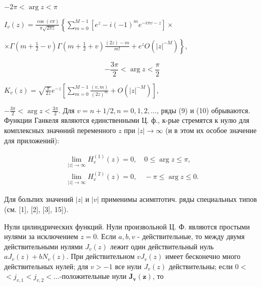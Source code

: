 \documentclass[10pt]{article}
\begin{document}
$-2 \pi<\arg z<\pi$



$I_{v}(z)=\frac{\cos (v \pi)}{\pi \sqrt{2 \pi z}}\left\{\sum_{m=0}^{M-1}\left[e^{z}-i(-1)^{m} e^{-i \pi v-z}\right] \times\right.$



$\left.\times \Gamma\left(m+\frac{1}{2}-v\right) \Gamma\left(m+\frac{1}{2}+v\right) \frac{(2 z)-m}{m !}+e^{z} O\left(|z|^{-M}\right)\right\}$,



\[

-\frac{3 \pi}{2}<\arg z<\frac{\pi}{2}

\]



$K_{v}(z)=\sqrt{\frac{\pi}{2 z}} e^{-z}\left[\sum_{m=0}^{M-1} \frac{(v, m)}{(2 z)^{m}}+O\left(|z|^{-M}\right)\right]$,



$-\frac{3 \pi}{2}<\arg z<\frac{3 \pi}{2}$. Для $v=n+1 / 2, n=0,1,2, \ldots$, ряды (9) и (10) обрываются. Функции Ганкеля являются единственными Ц. ф., к-рые стремятся к нулю для комплексных значөний переменного $z$ при $|z| \rightarrow \infty$ (и в этом их особое значение для приложений):



\[

\begin{gathered}

\lim _{|z| \rightarrow \infty} H_{v}^{(1)}(z)=0, \quad 0 \leqslant \arg z \leqslant \pi, \\

\lim _{|z| \rightarrow \infty} H_{v}^{(2)}(z)=0, \quad-\pi \leqslant \arg z \leqslant 0 .

\end{gathered}

\]



Для больпих значений $|z|$ и $|v|$ применимы асимптотич. ряды специальных типов (см. [1], [2], [3], 15]).



Нули цилиндрических функций. Нули произвольной Ц. Ф. являются простыми нулями за исключением $z=0$. Если $a, b, v$ - действительные, то между двумя действительными нулями $J_{v}(z)$ лежит один действительный нуль $a J_{v}(z)+b N_{v}(z)$. При действительном $v J_{v}(z)$ имеет бесконечно много действительных нулей; для $v>-1$ все нули $J_{v}(z)$ действительны; если $0<$ $<j_{v, 1}<j_{v, 2}<\ldots$-положительные нули $\boldsymbol{J}_{\boldsymbol{v}}(\boldsymbol{z})$, то
\end{document}
